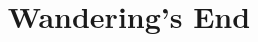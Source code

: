 \documentclass[11pt]{article}
\begin{document}
\ttfamily
\title{Wandering's End}
\maketitle
\end{document}
